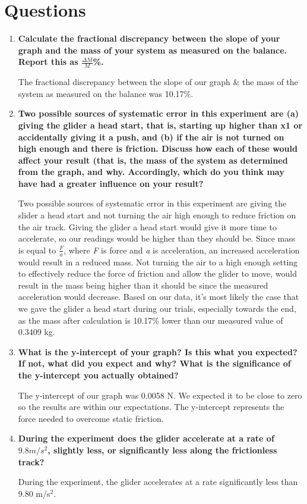 
 \section{Questions}

\vspace{-0.5cm}
\singlespacing

\begin{enumerate}
	\item \textbf{Calculate the fractional discrepancy between the slope of your graph and the mass of your system as measured on the balance. Report this as $\frac{\Delta{M}}{M}$\%.}

		The fractional discrepancy between the slope of our graph \& the mass of the system as measured on the balance was 10.17\%. 	

	\item \textbf{Two possible sources of systematic error in this experiment are (a) giving the glider a head start, that is, starting up higher than x1 or accidentally giving it a push, and (b) if the air is not turned on high enough and there is friction. Discuss how each of these would affect your result (that is, the mass of the system as determined from the graph, and why. Accordingly, which do you think may have had a greater influence on your result?}

		Two possible sources of systematic error in this experiment are giving the slider a head start and not turning the air high enough to reduce friction on the air track. Giving the glider a head start would give it more time to accelerate, so our readings would be higher than they should be. Since mass is equal to $\frac{F}{a}$, where \textit{F} is force and \textit{a} is acceleration, an increased acceleration would result in a reduced mass. Not turning the air to a high enough setting to effectively reduce the force of friction and allow the glider to move, would result in the mass being higher than it should be since the measured acceleration would decrease. Based on our data, it's most likely the case that we gave the glider a head start during our trials, especially towards the end, as the mass after calculation is 10.17\% lower than our measured value of 0.3409 kg. \par

\item \textbf{What is the y-intercept of your graph? Is this what you expected? If not, what did you expect and why? What is the significance of the y-intercept you actually obtained?}

The y-intercept of our graph was 0.0058 N. We expected it to be close to zero so the results are within our expectations. The y-intercept represents the force needed to overcome static friction.

\item \textbf{During the experiment does the glider accelerate at a rate of $9.8 m/s^2$, slightly less, or significantly less along the frictionless track?}

During the experiment, the glider accelerates at a rate significantly less than 9.80 m/s$^2$.

\end{enumerate}

\newpage
